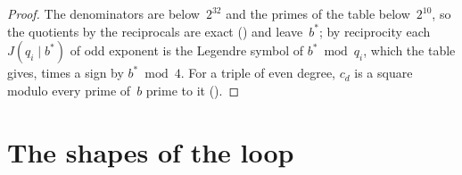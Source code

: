 \begin{proof}
  \leanok
  The denominators are below~$2^{32}$ and the primes of the table below~$2^{10}$, so the quotients
  by the reciprocals are exact () and leave~$b^*$; by
  reciprocity each $J(q_i \mid b^*)$ of odd exponent is the Legendre symbol of $b^* \bmod q_i$,
  which the table gives, times a sign by $b^* \bmod 4$. For a triple of even degree, $c_d$ is a
  square modulo every prime of~$b$ prime to it
  ().
\end{proof}

\section{The shapes of the loop}\label{sec:shapes}

